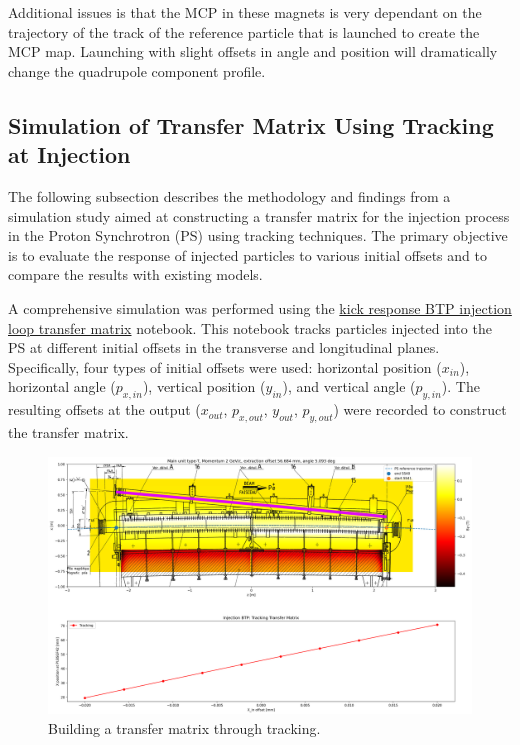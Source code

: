 Additional issues is that the MCP in these magnets is very dependant on the trajectory of the track of the reference particle that is launched to create the MCP map. Launching with slight offsets in angle and position will dramatically change the quadrupole component profile.



\subsection{Simulation of Transfer Matrix Using Tracking at Injection}

The following subsection describes the methodology and findings from a simulation study aimed at constructing a transfer matrix for the injection process in the Proton Synchrotron (PS) using tracking techniques. The primary objective is to evaluate the response of injected particles to various initial offsets and to compare the results with existing models.

A comprehensive simulation was performed using the  \href{https://gitlab.cern.ch/eljohnso/acc-models-tls-eliott-fork/-/blob/EliottBranch/ps_injection/kick_response_injection_tracking/kick_response_BTP_injection_loop_transfer_matrix.ipynb}{kick response BTP injection loop transfer matrix} notebook. This notebook tracks particles injected into the PS at different initial offsets in the transverse and longitudinal planes. Specifically, four types of initial offsets were used: horizontal position (\(x_{in}\)), horizontal angle (\(p_{x,in}\)), vertical position (\(y_{in}\)), and vertical angle (\(p_{y,in}\)). The resulting offsets at the output (\(x_{out}\), \(p_{x,out}\), \(y_{out}\), \(p_{y,out}\)) were recorded to construct the transfer matrix.

\begin{figure}[H]
\centering
\includegraphics[width=1.0\textwidth]{02_Simulation/images/injection_transfer_matrix_1.png}
\caption{Building a transfer matrix through tracking.}
\label{fig:transfer_matrix_1}
\end{figure}

